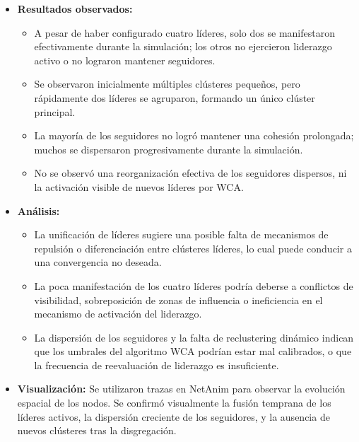 \documentclass{article}
\begin{document}
\begin{itemize}
\item \textbf{Resultados observados:}
\begin{itemize}
    \item A pesar de haber configurado cuatro líderes, solo dos se manifestaron efectivamente durante la simulación; los otros no ejercieron liderazgo activo o no lograron mantener seguidores.
    \item Se observaron inicialmente múltiples clústeres pequeños, pero rápidamente dos líderes se agruparon, formando un único clúster principal.
    \item La mayoría de los seguidores no logró mantener una cohesión prolongada; muchos se dispersaron progresivamente durante la simulación.
    \item No se observó una reorganización efectiva de los seguidores dispersos, ni la activación visible de nuevos líderes por WCA.
\end{itemize}

\item \textbf{Análisis:}
\begin{itemize}
    \item La unificación de líderes sugiere una posible falta de mecanismos de repulsión o diferenciación entre clústeres líderes, lo cual puede conducir a una convergencia no deseada.
    \item La poca manifestación de los cuatro líderes podría deberse a conflictos de visibilidad, sobreposición de zonas de influencia o ineficiencia en el mecanismo de activación del liderazgo.
    \item La dispersión de los seguidores y la falta de reclustering dinámico indican que los umbrales del algoritmo WCA podrían estar mal calibrados, o que la frecuencia de reevaluación de liderazgo es insuficiente.
\end{itemize}

\item \textbf{Visualización:}
Se utilizaron trazas en NetAnim para observar la evolución espacial de los nodos. Se confirmó visualmente la fusión temprana de los líderes activos, la dispersión creciente de los seguidores, y la ausencia de nuevos clústeres tras la disgregación.

\end{itemize}
\end{document}
